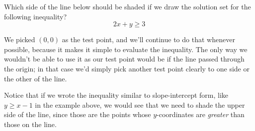 \begin{try}
Which side of the line below should be shaded if we draw the solution set for the following inequality? \[2x+y \geq 3\]
\begin{center}
\end{center}
\end{try}

We picked $(0,0)$ as the test point, and we'll continue to do that whenever possible, because it makes it simple to evaluate the inequality.  The only way we wouldn't be able to use it as our test point would be if the line passed through the origin; in that case we'd simply pick another test point clearly to one side or the other of the line.

Notice that if we wrote the inequality similar to slope-intercept form, like $y \geq x-1$ in the example above, we would see that we need to shade the upper side of the line, since those are the points whose $y$-coordinates are \emph{greater} than those on the line.
\vfill
\pagebreak

